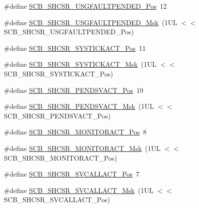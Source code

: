 \begin{DoxyCompactItemize}
\item 
\#define \hyperlink{group___c_m_s_i_s___s_c_b_ga3cf03acf1fdc2edc3b047ddd47ebbf87}{S\+C\+B\+\_\+\+S\+H\+C\+S\+R\+\_\+\+U\+S\+G\+F\+A\+U\+L\+T\+P\+E\+N\+D\+E\+D\+\_\+\+Pos}~12
\item 
\#define \hyperlink{group___c_m_s_i_s___s_c_b_ga122b4f732732010895e438803a29d3cc}{S\+C\+B\+\_\+\+S\+H\+C\+S\+R\+\_\+\+U\+S\+G\+F\+A\+U\+L\+T\+P\+E\+N\+D\+E\+D\+\_\+\+Msk}~(1\+U\+L $<$$<$ S\+C\+B\+\_\+\+S\+H\+C\+S\+R\+\_\+\+U\+S\+G\+F\+A\+U\+L\+T\+P\+E\+N\+D\+E\+D\+\_\+\+Pos)
\item 
\#define \hyperlink{group___c_m_s_i_s___s_c_b_gaec9ca3b1213c49e2442373445e1697de}{S\+C\+B\+\_\+\+S\+H\+C\+S\+R\+\_\+\+S\+Y\+S\+T\+I\+C\+K\+A\+C\+T\+\_\+\+Pos}~11
\item 
\#define \hyperlink{group___c_m_s_i_s___s_c_b_gafef530088dc6d6bfc9f1893d52853684}{S\+C\+B\+\_\+\+S\+H\+C\+S\+R\+\_\+\+S\+Y\+S\+T\+I\+C\+K\+A\+C\+T\+\_\+\+Msk}~(1\+U\+L $<$$<$ S\+C\+B\+\_\+\+S\+H\+C\+S\+R\+\_\+\+S\+Y\+S\+T\+I\+C\+K\+A\+C\+T\+\_\+\+Pos)
\item 
\#define \hyperlink{group___c_m_s_i_s___s_c_b_ga9b9fa69ce4c5ce7fe0861dbccfb15939}{S\+C\+B\+\_\+\+S\+H\+C\+S\+R\+\_\+\+P\+E\+N\+D\+S\+V\+A\+C\+T\+\_\+\+Pos}~10
\item 
\#define \hyperlink{group___c_m_s_i_s___s_c_b_gae0e837241a515d4cbadaaae1faa8e039}{S\+C\+B\+\_\+\+S\+H\+C\+S\+R\+\_\+\+P\+E\+N\+D\+S\+V\+A\+C\+T\+\_\+\+Msk}~(1\+U\+L $<$$<$ S\+C\+B\+\_\+\+S\+H\+C\+S\+R\+\_\+\+P\+E\+N\+D\+S\+V\+A\+C\+T\+\_\+\+Pos)
\item 
\#define \hyperlink{group___c_m_s_i_s___s_c_b_ga8b71cf4c61803752a41c96deb00d26af}{S\+C\+B\+\_\+\+S\+H\+C\+S\+R\+\_\+\+M\+O\+N\+I\+T\+O\+R\+A\+C\+T\+\_\+\+Pos}~8
\item 
\#define \hyperlink{group___c_m_s_i_s___s_c_b_gaad09b4bc36e9bccccc2e110d20b16e1a}{S\+C\+B\+\_\+\+S\+H\+C\+S\+R\+\_\+\+M\+O\+N\+I\+T\+O\+R\+A\+C\+T\+\_\+\+Msk}~(1\+U\+L $<$$<$ S\+C\+B\+\_\+\+S\+H\+C\+S\+R\+\_\+\+M\+O\+N\+I\+T\+O\+R\+A\+C\+T\+\_\+\+Pos)
\item 
\#define \hyperlink{group___c_m_s_i_s___s_c_b_ga977f5176be2bc8b123873861b38bc02f}{S\+C\+B\+\_\+\+S\+H\+C\+S\+R\+\_\+\+S\+V\+C\+A\+L\+L\+A\+C\+T\+\_\+\+Pos}~7
\item 
\#define \hyperlink{group___c_m_s_i_s___s_c_b_ga634c0f69a233475289023ae5cb158fdf}{S\+C\+B\+\_\+\+S\+H\+C\+S\+R\+\_\+\+S\+V\+C\+A\+L\+L\+A\+C\+T\+\_\+\+Msk}~(1\+U\+L $<$$<$ S\+C\+B\+\_\+\+S\+H\+C\+S\+R\+\_\+\+S\+V\+C\+A\+L\+L\+A\+C\+T\+\_\+\+Pos)
\item 
$$
\end{DoxyCompactItemize}

